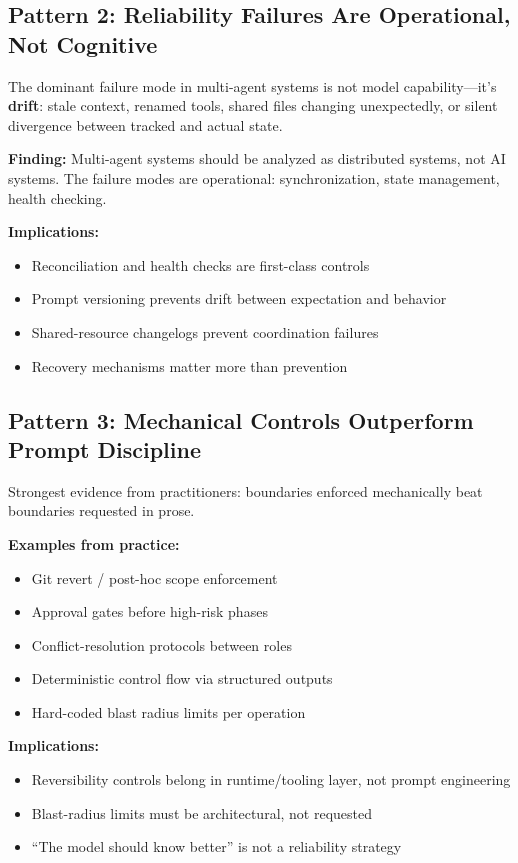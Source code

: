 \subsection{Pattern 2: Reliability Failures Are Operational, Not Cognitive}
\label{subsec:operational-failures}

The dominant failure mode in multi-agent systems is not model capability---it's \textbf{drift}: stale context, renamed tools, shared files changing unexpectedly, or silent divergence between tracked and actual state.

\textbf{Finding:} Multi-agent systems should be analyzed as distributed systems, not AI systems. The failure modes are operational: synchronization, state management, health checking.

\textbf{Implications:}
\begin{itemize}
    \item Reconciliation and health checks are first-class controls
    \item Prompt versioning prevents drift between expectation and behavior
    \item Shared-resource changelogs prevent coordination failures
    \item Recovery mechanisms matter more than prevention
\end{itemize}

\subsection{Pattern 3: Mechanical Controls Outperform Prompt Discipline}
\label{subsec:mechanical-controls}

Strongest evidence from practitioners: boundaries enforced mechanically beat boundaries requested in prose.

\textbf{Examples from practice:}
\begin{itemize}
    \item Git revert / post-hoc scope enforcement
    \item Approval gates before high-risk phases
    \item Conflict-resolution protocols between roles
    \item Deterministic control flow via structured outputs
    \item Hard-coded blast radius limits per operation
\end{itemize}

\textbf{Implications:}
\begin{itemize}
    \item Reversibility controls belong in runtime/tooling layer, not prompt engineering
    \item Blast-radius limits must be architectural, not requested
    \item ``The model should know better'' is not a reliability strategy
\end{itemize}

